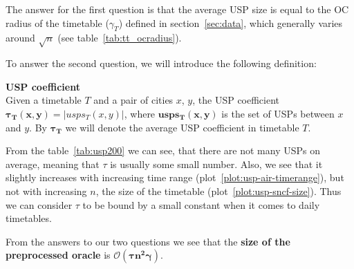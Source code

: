 		\noindent The answer for the first question is that the average USP size is equal to the OC radius of the timetable ($\gamma_{T}$) defined in section~\ref{sec:data}, which generally varies around $\sqrt{n}$ (see table~\ref{tab:tt_ocradius}). 
		
		\noindent To answer the second question, we will introduce the following definition:
		
		\begin{definition}
	        \textbf{USP coefficient} \\
			Given a timetable $T$ and a pair of cities $x$, $y$, the USP coefficient $\bm{\tau_{T}(x, y)} = |usps_{T}(x, y)|$, where $\bm{usps_{T}(x, y)}$ is the set of USPs between $x$ and $y$. By $\bm{\tau_{T}}$ we will denote the average USP coefficient in timetable $T$.
	    \end{definition}
	    
	    \noindent From the table~\ref{tab:usp200} we can see, that there are not many USPs on average, meaning that $\tau$ is usually some small number. Also, we see that it slightly increases with increasing time range (plot~\ref{plot:usp-air-timerange}), but not with increasing $n$, the size of the timetable (plot~\ref{plot:usp-sncf-size}). Thus we can consider $\tau$ to be bound by a small constant when it comes to daily timetables. 
	    
	    From the answers to our two questions we see that the \textbf{size of the preprocessed oracle} is $\bm{\mathcal{O}(\tau n^{2} \gamma)}$.
	
		\begin{figure}[H]
		\centering
		\end{figure}
	
